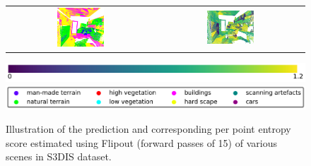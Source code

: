 \begin{figure}[h!]
\begin{tabular}{cc}
            \includegraphics[width=0.33\textwidth, height=0.18\textheight]{images/seg_output/s3dis_DE/office_42.pdf}& 
            \includegraphics[width=0.33\textwidth, height=0.18\textheight]{images/seg_output/flipout/ent_fout_s3dis_4.pdf}\\
        \end{tabular}
        \includegraphics[scale=0.45]{images/ent_legend.pdf}
        \includegraphics[scale=0.45]{images/legend.png}
        \caption{Illustration of the prediction and corresponding per point entropy score estimated using Flipout (forward passes of 15) of various scenes in S3DIS dataset.}
        \label{fig:fout_s3dis_entmap}
    \end{figure}
    \FloatBarrier
